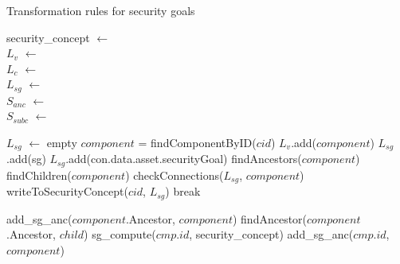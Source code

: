 \begin{algorithm}[H]
\caption{Transformation rules for security goals}
security\_concept $\gets$  \\
$L_v$ $\gets$  \\
$L_c$ $\gets$  \\
$L_{sg}$ $\gets$  \\
$S_{anc}$ $\gets$  \\
$S_{subc}$ $\gets$  \\

\begin{algorithmic}[1]

\State $L_{sg}$ $\gets$ empty
\State $component$ = findComponentByID($cid$)
\State $L_v$.add($component$) \label{line:visited}
 \label{line:iterate_own_sg}
	\State $L_{sg}$.add(sg)	
\EndFor
{}
\State $L_{sg}$.add(con.data.asset.securityGoal)
\EndFor
\State findAncestors($component$) 
\State findChildren($component$) 
\State checkConnections($L_{sg}$, $component$)
\State writeToSecurityConcept($cid$, $L_{sg}$) 
\Else
\State break
\EndIf
\EndFunction

\EndIf
\State add\_sg\_anc($component$.Ancestor, $component$)
\State findAncestor($component$.Ancestor, $child$)
\Else
{}
\State sg\_compute($cmp.id$, security\_concept) \label{line:ancestor}
\State add\_sg\_anc($cmp.id$, $component$)
\EndFor
\EndIf

\EndFunction
{} 

\end{algorithmic}
\end{algorithm}


